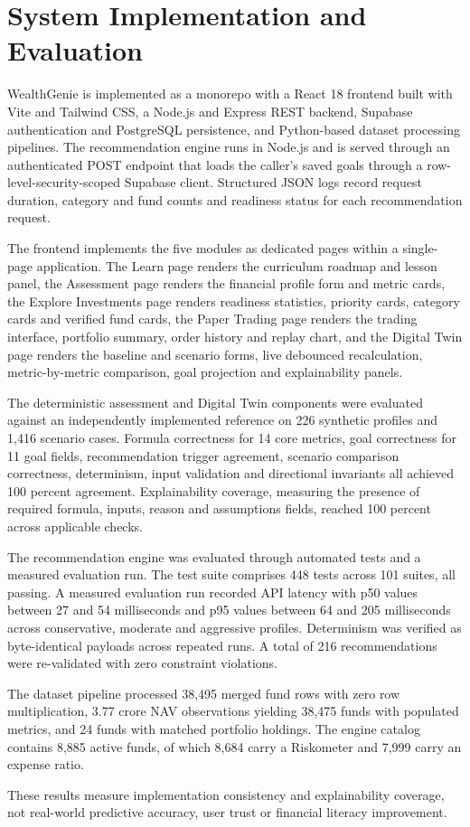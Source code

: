 \section{System Implementation and Evaluation}

WealthGenie is implemented as a monorepo with a React 18 frontend built with Vite and Tailwind CSS, a Node.js and Express REST backend, Supabase authentication and PostgreSQL persistence, and Python-based dataset processing pipelines. The recommendation engine runs in Node.js and is served through an authenticated POST endpoint that loads the caller's saved goals through a row-level-security-scoped Supabase client. Structured JSON logs record request duration, category and fund counts and readiness status for each recommendation request.

The frontend implements the five modules as dedicated pages within a single-page application. The Learn page renders the curriculum roadmap and lesson panel, the Assessment page renders the financial profile form and metric cards, the Explore Investments page renders readiness statistics, priority cards, category cards and verified fund cards, the Paper Trading page renders the trading interface, portfolio summary, order history and replay chart, and the Digital Twin page renders the baseline and scenario forms, live debounced recalculation, metric-by-metric comparison, goal projection and explainability panels.

The deterministic assessment and Digital Twin components were evaluated against an independently implemented reference on 226 synthetic profiles and 1,416 scenario cases. Formula correctness for 14 core metrics, goal correctness for 11 goal fields, recommendation trigger agreement, scenario comparison correctness, determinism, input validation and directional invariants all achieved 100 percent agreement. Explainability coverage, measuring the presence of required formula, inputs, reason and assumptions fields, reached 100 percent across applicable checks.

The recommendation engine was evaluated through automated tests and a measured evaluation run. The test suite comprises 448 tests across 101 suites, all passing. A measured evaluation run recorded API latency with p50 values between 27 and 54 milliseconds and p95 values between 64 and 205 milliseconds across conservative, moderate and aggressive profiles. Determinism was verified as byte-identical payloads across repeated runs. A total of 216 recommendations were re-validated with zero constraint violations.

The dataset pipeline processed 38,495 merged fund rows with zero row multiplication, 3.77 crore NAV observations yielding 38,475 funds with populated metrics, and 24 funds with matched portfolio holdings. The engine catalog contains 8,885 active funds, of which 8,684 carry a Riskometer and 7,999 carry an expense ratio.

These results measure implementation consistency and explainability coverage, not real-world predictive accuracy, user trust or financial literacy improvement.